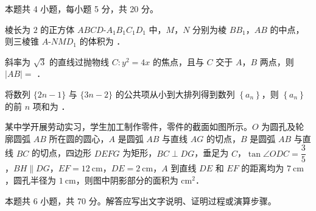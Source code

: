 \begin{gktip}
本题共 4 小题，每小题 5 分，共 20 分。
\end{gktip}

\begin{question}
棱长为 $2$ 的正方体 $ABCD\text{-}A_1B_1C_1D_1$ 中，$M$，$N$ 分别为棱 $BB_1$，$AB$ 的中点，则三棱锥 $A\text{-}NMD_1$ 的体积为 \gkblank{}．

\end{question}
\begin{question}
斜率为 $\sqrt3$ 的直线过抛物线 $C:y^{2}=4x$ 的焦点，且与 $C$ 交于 $A$，$B$ 两点，则 $|AB|=$ \gkblank{}．

\end{question}
\begin{question}
将数列 $\{2n-1\}$ 与 $\{3n-2\}$ 的公共项从小到大排列得到数列 $\left\{a_n\right\}$，则 $\left\{a_n\right\}$ 的前 $n$ 项和为 \gkblank{}．

\Needspace{0.4\textheight}
\end{question}
\begin{question}
某中学开展劳动实习，学生加工制作零件，零件的截面如图所示。$O$ 为圆孔及轮廓圆弧 $AB$ 所在圆的圆心，$A$ 是圆弧 $AB$ 与直线 $AG$ 的切点，$B$ 是圆弧 $AB$ 与直线 $BC$ 的切点，四边形 $DEFG$ 为矩形，$BC\perp DG$，垂足为 $C$，$\tan\angle ODC=\dfrac35$，$BH\parallel DG$，$EF=12\ \mathrm{cm}$，$DE=2\ \mathrm{cm}$，$A$ 到直线 $DE$ 和 $EF$ 的距离均为 $7\ \mathrm{cm}$，圆孔半径为 $1\ \mathrm{cm}$，则图中阴影部分的面积为 \gkblank{} $\mathrm{cm}^{2}$．
\nopagebreak[4]
\begin{center}\end{center}
\nopagebreak[4]
\par\medskip

\end{question}

\begin{gktip}
本题共 6 小题，共 70 分。解答应写出文字说明、证明过程或演算步骤。
\end{gktip}

